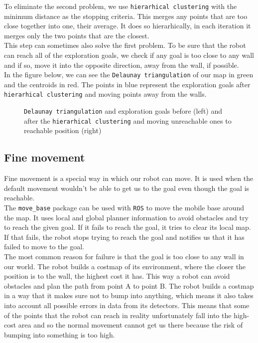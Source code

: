 \documentclass[12pt,a4paper]{article}
\begin{document}
	To eliminate the second problem, we use \texttt{hierarhical clustering} with the minimum distance as the stopping criteria. This merges any points that are too close together into one, their average. It does so hierarhically, in each iteration it merges only the two points that are the closest. \\
	
	This step can sometimes also solve the first problem. To be sure that the robot can reach all of the exploration goals, we check if any goal is too close to any wall and if so, move it into the opposite direction, away from the wall, if possible. \\

	In the figure below, we can see the \texttt{Delaunay triangulation} of our map in green and the centroids in red. The points in blue represent the exploration goals after \texttt{hierarhical clustering} and moving points away from the walls.

	\begin{figure}[h]
		\centering
		\caption{\texttt{Delaunay triangulation} and exploration goals before (left) and after the \texttt{hierarhical clustering} and moving unreachable ones to reachable position (right)}
		\label{fig:exploration_goals}
	\end{figure}
	
	\subsection{Fine movement} \label{fine_movement}
	Fine movement is a special way in which our robot can move. It is used when the default movement wouldn't be able to get us to the goal even though the goal is reachable.  \\

	The \texttt{move\_base} package can be used with \texttt{ROS} to move the mobile base around the map. It uses local and global planner information to avoid obstacles and try to reach the given goal. If it fails to reach the goal, it tries to clear its local map. If that fails, the robot stops trying to reach the goal and notifies us that it has failed to move to the goal. \\
	
	The most common reason for failure is that the goal is too close to any wall in our world. The robot builds a costmap of its environment, where the closer the position is to the wall, the highest cost it has. This way a robot can avoid obstacles and plan the path from point A to point B. The robot builds a costmap in a way that it makes sure not to bump into anything, which means it also takes into account all possible errors in data from its detectors. This means that some of the points that the robot can reach in reality unfortunately fall into the high-cost area and so the normal movement cannot get us there because the risk of bumping into something is too high. \\
\end{document}

